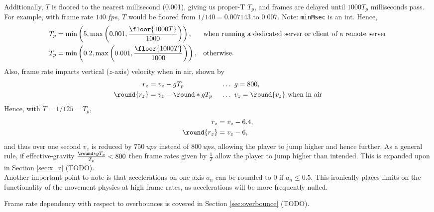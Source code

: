 Additionally, $T$ is floored to the nearest millisecond (0.001), giving us proper-T $T_p$, and frames are delayed until $1000T_p$ milliseconds pass.
For example, with frame rate $\qty{140}{fps}$, $T$ would be floored from $1/140 = 0.007143$ to 0.007. Note: \texttt{minMsec} is an int.
Hence,
\begin{align*}
T_p &= \min\left(5, \max\left(0.001, \frac{\floor{1000T}}{1000} \right) \right), &&\text{when running a dedicated server or client of a remote server}\\
T_p &= \min\left(0.2, \max\left(0.001, \frac{\floor{1000T}}{1000} \right) \right), &&\text{otherwise.}
\end{align*}
Also, frame rate impacts vertical ($z$-axis) velocity when in air, shown by
\begin{align*}
r_z &= v_z - gT_p\ &&\ldots\ g = 800,\\
\round{r_z} &= v_z - \round*{gT_p}\ &&\ldots\ v_z = \round{v_z}\ \text{when in air}
\end{align*}
Hence, with $T = 1/125 = T_p$,
\begin{align*}
r_z &= v_z - 6.4,\\
\round{r_z} &= v_z - 6,
\end{align*}
and thus over one second $v_z$ is reduced by $\qty{750}{ups}$ instead of $\qty{800}{ups}$, allowing the player to jump higher and hence further.
As a general rule, if effective-gravity $\frac{\round*{gT_p}}{T_p} < 800$ then frame rates given by $\frac{1}{T}$ allow the player to jump higher than intended.
This is expanded upon in Section \ref{sec:x_z} (TODO).\\

Another important point to note is that accelerations on one axis $a_n$ can be rounded to 0 if $a_n\le 0.5$.
This ironically places limits on the functionality of the movement physics at high frame rates, as accelerations will be more frequently nulled.


Frame rate dependency with respect to overbounces is covered in Section \ref{sec:overbounce} (TODO).


